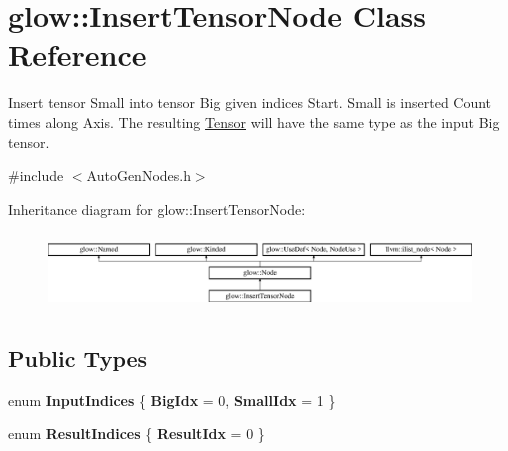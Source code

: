 \hypertarget{classglow_1_1_insert_tensor_node}{}\section{glow\+:\+:Insert\+Tensor\+Node Class Reference}
\label{classglow_1_1_insert_tensor_node}


Insert tensor Small into tensor Big given indices Start. Small is inserted Count times along Axis. The resulting \hyperlink{classglow_1_1_tensor}{Tensor} will have the same type as the input Big tensor.  




{\ttfamily \#include $<$Auto\+Gen\+Nodes.\+h$>$}

Inheritance diagram for glow\+:\+:Insert\+Tensor\+Node\+:\begin{figure}[H]
\begin{center}
\leavevmode
\includegraphics[height=2.028986cm]{classglow_1_1_insert_tensor_node}
\end{center}
\end{figure}
\subsection*{Public Types}
\begin{DoxyCompactItemize}
\item 
\mbox{\label{classglow_1_1_insert_tensor_node_a53f919d8f73c88c52b643f260c9dd222}} 
enum {\bfseries Input\+Indices} \{ {\bfseries Big\+Idx} = 0, 
{\bfseries Small\+Idx} = 1
 \}
\item 
\mbox{\label{classglow_1_1_insert_tensor_node_abab9ae46ea6593718fe6291a998072ce}} 
enum {\bfseries Result\+Indices} \{ {\bfseries Result\+Idx} = 0
 \}
\end{DoxyCompactItemize}
